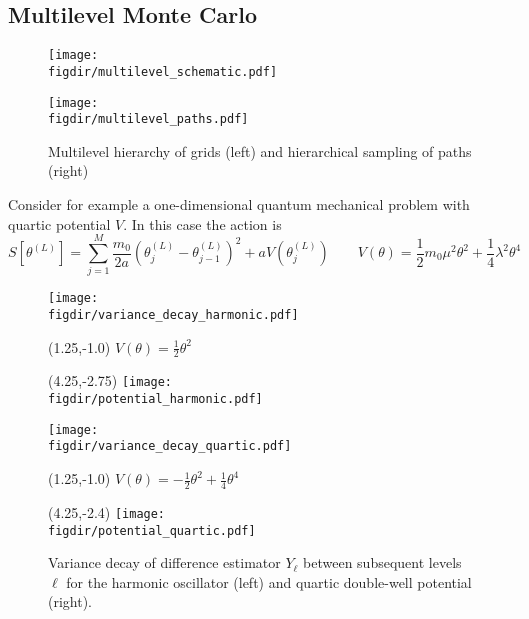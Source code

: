 \documentclass[11pt]{article}
\newcommand{\figdir}{./figures/}
\begin{document}
\subsection{Multilevel Monte Carlo}
\begin{figure}
  \begin{center}
  \begin{minipage}{0.55\linewidth}
    \texttt{[image: \\figdir/multilevel\_schematic.pdf]}
  \end{minipage}
  \hfill
  \begin{minipage}{0.4\linewidth}
    \texttt{[image: \\figdir/multilevel\_paths.pdf]}
  \end{minipage}
  \caption{Multilevel hierarchy of grids (left) and hierarchical sampling of paths (right)}
  \end{center}
\end{figure}
Consider for example a one-dimensional quantum mechanical problem with quartic potential $V$. In this case the action is
\begin{equation}
  S\left[\theta^{(L)}\right] = \sum_{j=1}^M \frac{m_0}{2a}\left(\theta^{(L)}_j-\theta^{(L)}_{j-1}\right)^2 + aV\left(\theta^{(L)}_j\right)\qquad V(\theta) = \frac{1}{2}m_0\mu^2\theta^2+\frac{1}{4}\lambda^2\theta^4
\end{equation}
\begin{figure}
  \begin{center}
  \begin{minipage}{0.45\linewidth}
    \texttt{[image: \\figdir/variance\_decay\_harmonic.pdf]}
    \begin{textblock}{4.0}(1.25,-1.0)
      $V(\theta)=\frac{1}{2}\theta^2$
    \end{textblock}
    \begin{textblock}{4.0}(4.25,-2.75)
      \texttt{[image: \\figdir/potential\_harmonic.pdf]}
    \end{textblock}
  \end{minipage}
  \hfill
  \begin{minipage}{0.45\linewidth}
    \texttt{[image: \\figdir/variance\_decay\_quartic.pdf]}
    \begin{textblock}{4.0}(1.25,-1.0)
      $V(\theta)=-\frac{1}{2}\theta^2+\frac{1}{4}\theta^4$
    \end{textblock}
    \begin{textblock}{4.0}(4.25,-2.4)
      \texttt{[image: \\figdir/potential\_quartic.pdf]}
    \end{textblock}
  \end{minipage}
  \caption{Variance decay of difference estimator $Y_\ell$ between subsequent levels $\ell$ for the harmonic oscillator (left) and quartic double-well potential (right).}
  \end{center}
\end{figure}
\end{document}
